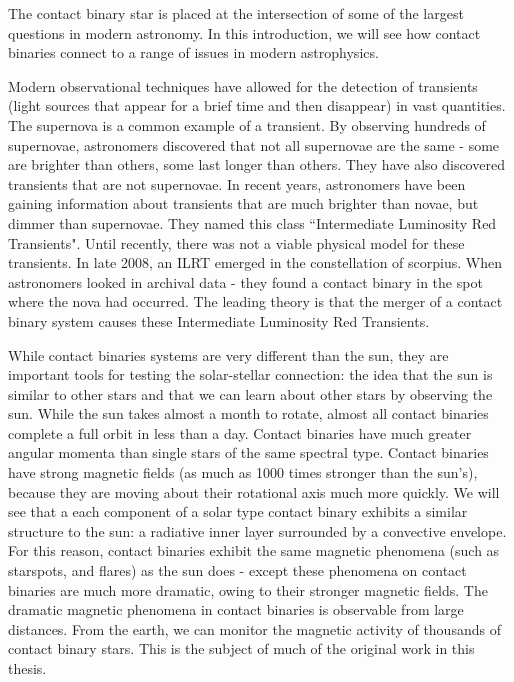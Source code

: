 \documentclass[12pt]{article} %
\numberwithin{equation}{section} %
\begin{document}
The contact binary star is placed at the intersection of some of the largest questions in modern astronomy. In this introduction, we will see how contact binaries connect to a range of issues in modern astrophysics.

Modern observational techniques have allowed for the detection of transients (light sources that appear for a brief time and then disappear) in vast quantities. The supernova  is a common example of a transient. By observing hundreds of supernovae, astronomers discovered that not all supernovae are the same - some are brighter than others, some last longer than others. They have also discovered transients that are not supernovae. In recent years, astronomers have been gaining information about transients that are much brighter than novae, but dimmer than supernovae. They named this class ``Intermediate Luminosity Red Transients". Until recently, there was not a viable physical model for these transients. In late 2008, an ILRT emerged in the constellation of scorpius. When astronomers looked in archival data - they found a contact binary in the spot where the nova had occurred. The leading theory is that the merger of a contact binary system causes these Intermediate Luminosity Red Transients.

While contact binaries systems are very different than the sun, they are important tools for testing the solar-stellar connection: the idea that the sun is similar to other stars and that we can learn about other stars by observing the sun. While the sun takes almost a month to rotate, almost all contact binaries complete a full orbit in less than a day. Contact binaries have much greater angular momenta than single stars of the same spectral type. Contact binaries have strong magnetic fields (as much as 1000 times stronger than the sun's), because they are moving about their rotational axis much more quickly. We will see that a each component of a solar type contact binary exhibits a similar structure to the sun: a radiative inner layer surrounded by a convective envelope. For this reason, contact binaries exhibit the same magnetic phenomena (such as starspots, and flares) as the sun does - except these phenomena on contact binaries are much more dramatic, owing to their stronger magnetic fields. The dramatic magnetic phenomena in contact binaries is observable from large distances. From the earth, we can monitor the magnetic activity of thousands of contact binary stars. This is the subject of much of the original work in this thesis.
\end{document}

